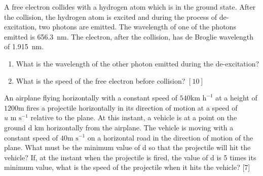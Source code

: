\begin{problem}
    A free electron collides with a hydrogen atom which is in the ground state. After the collision, the hydrogen atom is excited and during the process of de-excitation, two photons are emitted. The wavelength of one of the photons emitted is \qty{656.3}{\nm}. The electron, after the collision, has de Broglie wavelength of \qty{1.915}{\nm}.
    \renewcommand{\theenumi}{(\alph{enumi})}
    \begin{enumerate}
        \item What is the wavelength of the other photon emitted during the de-excitation?
        \item What is the speed of the free electron before collision? \hfill $[10]$
    \end{enumerate}
\end{problem}

\begin{problem}
    \begin{subproblem}
        An airplane flying horizontally with a constant speed of $540 \text{km h}^{-1}$ at a height of $1200 \text{m}$ fires a projectile horizontally in its direction of motion at a speed of $u \text{ m s}^{-1}$ relative to the plane. At this instant, a vehicle is at a point on the ground d km horizontally from the airplane. The vehicle is moving with a constant speed of $40 \text{m s}^{-1}$ on a horizontal road in the direction of motion of the plane. What must be the minimum value of d so that the projectile will hit the vehicle? If, at the instant when the projectile is fired, the value of d is 5 times its minimum value, what is the speed of the projectile when it hits the vehicle? [7]
    \end{subproblem}
\end{problem}